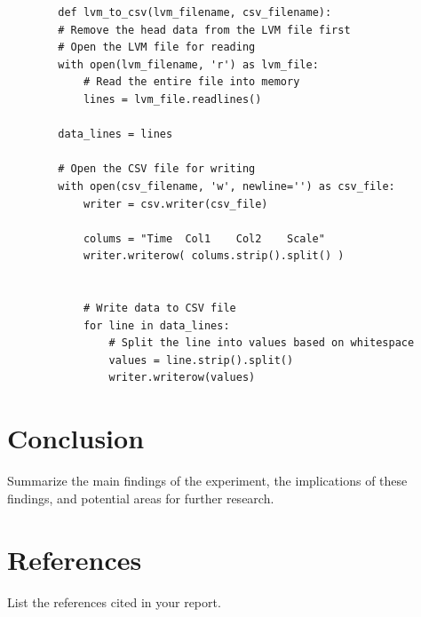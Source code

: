 \documentclass[12pt]{article}
\begin{document}
    \lstset{language=Python}
    \lstset{frame=lines}
    \lstset{basicstyle=\footnotesize}
    \begin{lstlisting}
        def lvm_to_csv(lvm_filename, csv_filename):
        # Remove the head data from the LVM file first
        # Open the LVM file for reading
        with open(lvm_filename, 'r') as lvm_file:
            # Read the entire file into memory
            lines = lvm_file.readlines()
    
        data_lines = lines
    
        # Open the CSV file for writing
        with open(csv_filename, 'w', newline='') as csv_file:
            writer = csv.writer(csv_file)
            
            colums = "Time	Col1	Col2	Scale"
            writer.writerow( colums.strip().split() )
            
            
            # Write data to CSV file
            for line in data_lines:
                # Split the line into values based on whitespace
                values = line.strip().split()
                writer.writerow(values)
    \end{lstlisting}

\section{Conclusion}
    Summarize the main findings of the experiment, the implications of these findings, and potential areas for further research.

\section{References}
    List the references cited in your report.
\end{document}
